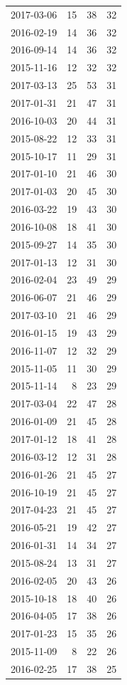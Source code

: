 \begin{tabular}{lrrr}
2017-03-06 & 15 & 38 & 32 \\
2016-02-19 & 14 & 36 & 32 \\
2016-09-14 & 14 & 36 & 32 \\
2015-11-16 & 12 & 32 & 32 \\
2017-03-13 & 25 & 53 & 31 \\
2017-01-31 & 21 & 47 & 31 \\
2016-10-03 & 20 & 44 & 31 \\
2015-08-22 & 12 & 33 & 31 \\
2015-10-17 & 11 & 29 & 31 \\
2017-01-10 & 21 & 46 & 30 \\
2017-01-03 & 20 & 45 & 30 \\
2016-03-22 & 19 & 43 & 30 \\
2016-10-08 & 18 & 41 & 30 \\
2015-09-27 & 14 & 35 & 30 \\
2017-01-13 & 12 & 31 & 30 \\
2016-02-04 & 23 & 49 & 29 \\
2016-06-07 & 21 & 46 & 29 \\
2017-03-10 & 21 & 46 & 29 \\
2016-01-15 & 19 & 43 & 29 \\
2016-11-07 & 12 & 32 & 29 \\
2015-11-05 & 11 & 30 & 29 \\
2015-11-14 & 8 & 23 & 29 \\
2017-03-04 & 22 & 47 & 28 \\
2016-01-09 & 21 & 45 & 28 \\
2017-01-12 & 18 & 41 & 28 \\
2016-03-12 & 12 & 31 & 28 \\
2016-01-26 & 21 & 45 & 27 \\
2016-10-19 & 21 & 45 & 27 \\
2017-04-23 & 21 & 45 & 27 \\
2016-05-21 & 19 & 42 & 27 \\
2016-01-31 & 14 & 34 & 27 \\
2015-08-24 & 13 & 31 & 27 \\
2016-02-05 & 20 & 43 & 26 \\
2015-10-18 & 18 & 40 & 26 \\
2016-04-05 & 17 & 38 & 26 \\
2017-01-23 & 15 & 35 & 26 \\
2015-11-09 & 8 & 22 & 26 \\
2016-02-25 & 17 & 38 & 25 \\

\end{tabular}

